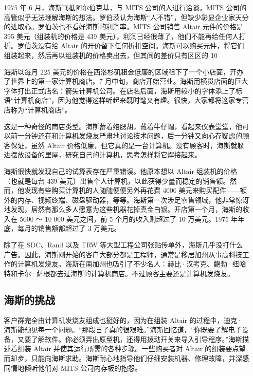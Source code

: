 \documentclass[12pt,UTF8]{ctexbook}
\begin{document}
1975 年 6 月，海斯飞抵阿尔伯克基，与 MITS 公司的人进行洽谈。MITS 公司的高管似乎无法理解海斯的想法。罗伯茨认为海斯“人不错”，但缺少彰显企业家天分的进取心。罗伯茨也不看好海斯的利润率。MITS 公司销售 Altair 元件的价格是 395 美元（组装机的价格是 439 美元），利润已经很薄了，他们不能再给任何人打折。罗伯茨没有给 Altair 的开价留下任何折扣空间。海斯可以购买元件，将它们组装起来，然后再以组装机的价格卖出去，但其间的差价只有区区的 10%

海斯以每月 225 美元的价格在西洛杉矶租金低廉的区域租下了一个小店面，开办了世界上的第一家计算机商店。7 月中旬，商店开始营业。海斯用横贯店面的巨大字体打出正式店名：箭矢计算机公司。在店名后面，海斯用较小的字体添上了标语“计算机商店”，因为他觉得这样听起来既时髦又有趣。很快，大家都将这家专营店称为“计算机商店”。

这是一种奇怪的商店类型。海斯蓄着络腮胡，戴着牛仔帽，看起来仪表堂堂，他可以前一分钟还在和计算机发烧友严肃地讨论技术问题，后一分钟又向心存疑虑的顾客保证，虽然 Altair 价格低廉，但它真的是一台计算机。没有顾客时，海斯就躲进摆放设备的里屋，研究自己的计算机，思考怎样将它焊接起来。

海斯很快就发现自己的试算表存在严重错误。他原本想以 Altair 组装机的价格（也就是每台 439 美元）出售个人计算机，以此获得少量而稳定的销售额。然而，他发现有些购买计算机的人随随便便另外再花费 4000 美元来购买配件——额外的内存、视频终端、磁盘驱动器，等等。海斯第一次涉足零售领域，他非常惊讶地发现，居然有那么多人愿意为这些机器花掉真金白银。开店第一个月，海斯的收入在 5000 ～ 10 000 美元之间，前 5 个月的收入则超过了 10 万美元。1975 年年底，每月的销售额都超过了 3 万美元。

除了在 SDC、Rand 以及 TRW 等大型工程公司张贴传单外，海斯几乎没打什么广告。因此，海斯刚开始的客户大部分都是工程师，通常是移居加州从事高科技工作的计算机发烧友。海斯在南加州也吸引了不少名人：赫比·汉考克、鲍勃·纽哈特和卡尔·萨根都去过海斯的计算机商店。不过顾客主要还是计算机发烧友。





\subsection{海斯的挑战}


客户群完全由计算机发烧友组成也挺好的，因为在组装 Altair 的过程中，迪克·海斯能预见每一个问题。“那段日子真的很艰难。”海斯回忆道，“你既要了解电子设备，又要了解软件。你必须弄出原型机，还得用拨动开关来导入引导程序。”海斯描述着组装 Altair 并使其运行所需的各种步骤。一些购买者对 Altair 的组装要点望而却步，只能向海斯求助。海斯耐心地指导他们仔细安装机器、修理故障，并深感同情地倾听他们对 MITS 公司内存板的抱怨。
\end{document}
